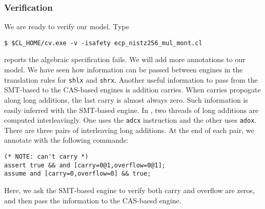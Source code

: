 \documentclass{amsproc}
\begin{document}
\subsubsection{Verification}

We are ready to verify our model. Type
\begin{verbatim}
$ $CL_HOME/cv.exe -v -isafety ecp_nistz256_mul_mont.cl
\end{verbatim}

\cryptoline reports the algebraic specification fails. We will add
more annotations to our model. We have seen how information can be
passed between engines in the translation rules for \texttt{shlx} and
\texttt{shrx}. Another useful information to pass from the SMT-based
to the CAS-based 
engines is addition carries. When carries propogate along long
additions, the last carry is almost always zero. Such information is
easily inferred with the SMT-based engine. In \nistzmul, two threads
of long additions are computed interleavingly. One uses the
\xeightysix \texttt{adcx} instruction and the other uses
\texttt{adox}. There are three pairs of interleaving long
additions. At the end of each pair, we annotate \nistzmulcl with the
following commands:
\begin{verbatim}
(* NOTE: can't carry *)
assert true && and [carry=0@1,overflow=0@1];
assume and [carry=0,overflow=0] && true;
\end{verbatim}
Here, we ask the SMT-based engine to verify both carry and overflow
are zeros, and then pass the information to the CAS-baesd engine.
\end{document}
